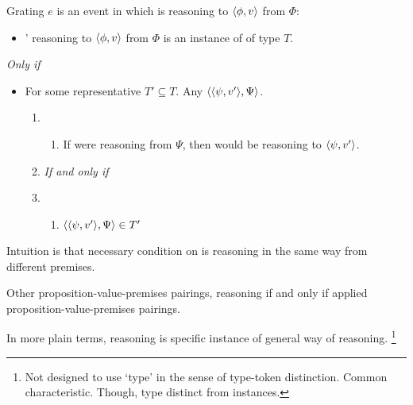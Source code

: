 \begin{note}
  \begin{definition}[\sR{2}]
    \label{def:cmptnc}

    Grating \(e\) is an event in which \vAgent{} is reasoning to \(\langle \phi, v \rangle\) from \(\Phi\):

    \begin{itemize}
    \item
      \vAgent{}' reasoning to \(\langle \phi, v \rangle\) from \(\Phi\) is an instance of \emph{} of type \(T\).
    \end{itemize}

    \emph{Only if}

    \begin{itemize}
    \item
      For some representative \(T' \subseteq T\).
      Any \(\langle \langle \psi, v' \rangle, \Psi \rangle\).

      \begin{enumerate}[label=]
      \item
        \begin{enumerate}[label=\alph*., ref=(\alph*)]
        \item
          If \vAgent{} were reasoning from \(\Psi\), then \vAgent{} would be reasoning to \(\langle \psi, v' \rangle\).
        \end{enumerate}
      \item
        \emph{If and only if}
      \item
        \begin{enumerate}[label=\alph*., ref=(\alph*), resume]
        \item
          \(\langle \langle \psi, v' \rangle, \Psi \rangle \in T'\)
        \end{enumerate}
      \end{enumerate}
    \end{itemize}
    \end{definition}

  Intuition is that necessary condition on \sR{} is reasoning in the same way from different premises.

    Other proposition-value-premises pairings, reasoning if and only if applied proposition-value-premises pairings.

  In more plain terms, reasoning is specific instance of general way of reasoning.%
  \footnote{
    Not designed to use `type' in the sense of type-token distinction.
    Common characteristic.
    Though, type distinct from instances.
  }
\end{note}

